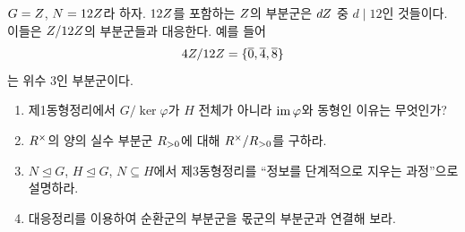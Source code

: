 \begin{example}
$G=Z$, $N=12Z$라 하자. $12Z$를 포함하는 $Z$의 부분군은 $dZ$ 중 $d\mid12$인 것들이다. 이들은 $Z/12Z$의 부분군들과 대응한다. 예를 들어
\[
  4Z/12Z=\{\overline0,\overline4,\overline8\}
\]
는 위수 $3$인 부분군이다.
\end{example}

\begin{checkpoint}
\begin{enumerate}[label=\arabic*.]
  \item 제1동형정리에서 $G/\ker\varphi$가 $H$ 전체가 아니라 $\operatorname{im}\varphi$와 동형인 이유는 무엇인가?
  \item $R^\times$의 양의 실수 부분군 $R_{>0}$에 대해 $R^\times/R_{>0}$를 구하라.
  \item $N\trianglelefteq G$, $H\trianglelefteq G$, $N\subseteq H$에서 제3동형정리를 ``정보를 단계적으로 지우는 과정''으로 설명하라.
  \item 대응정리를 이용하여 순환군의 부분군을 몫군의 부분군과 연결해 보라.
\end{enumerate}
\end{checkpoint}
